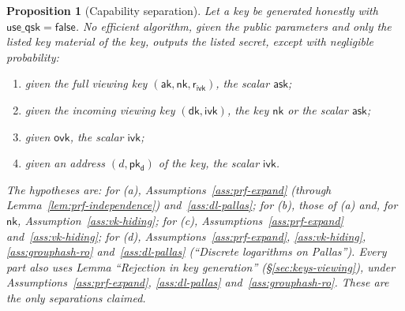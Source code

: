 \documentclass[11pt,a4paper]{article}
\newtheorem{proposition}[theorem]{Proposition}
\theoremstyle{definition}
\newcommand{\ask}{\ensuremath{\mathsf{ask}}}
\newcommand{\aksym}{\ensuremath{\mathsf{ak}}}
\newcommand{\nksym}{\ensuremath{\mathsf{nk}}}
\newcommand{\ivk}{\ensuremath{\mathsf{ivk}}}
\newcommand{\ovk}{\ensuremath{\mathsf{ovk}}}
\newcommand{\dk}{\ensuremath{\mathsf{dk}}}
\newcommand{\pkd}{\ensuremath{\mathsf{pk_d}}}
\newcommand{\rivk}{\ensuremath{\mathsf{r_{ivk}}}}
\begin{document}
\begin{proposition}[Capability separation]\label{prop:capabilities}
Let a key be generated honestly with $\mathsf{use\_qsk} = \mathsf{false}$.
No efficient algorithm, given the public parameters and only the listed key
material of the key, outputs the listed secret, except with negligible
probability:
\begin{enumerate}
\item[(a)] given the full viewing key $(\aksym, \nksym, \rivk)$, the scalar
  $\ask$;
\item[(b)] given the incoming viewing key $(\dk, \ivk)$, the key $\nksym$ or
  the scalar $\ask$;
\item[(c)] given $\ovk$, the scalar $\ivk$;
\item[(d)] given an address $(d, \pkd)$ of the key, the scalar $\ivk$.
\end{enumerate}
The hypotheses are: for (a), Assumptions~\ref{ass:prf-expand} (through
Lemma~\ref{lem:prf-independence}) and~\ref{ass:dl-pallas}; for (b), those of
(a) and, for $\nksym$, Assumption~\ref{ass:vk-hiding}; for (c),
Assumptions~\ref{ass:prf-expand} and~\ref{ass:vk-hiding}; for (d),
Assumptions~\ref{ass:prf-expand}, \ref{ass:vk-hiding},
\ref{ass:grouphash-ro} and~\ref{ass:dl-pallas} (``Discrete logarithms on
Pallas''). Every part also uses Lemma ``Rejection in key generation''
(\S\ref{sec:keys-viewing}), under Assumptions~\ref{ass:prf-expand},
\ref{ass:dl-pallas} and~\ref{ass:grouphash-ro}. These are the only
separations claimed.
\end{proposition}
\end{document}
